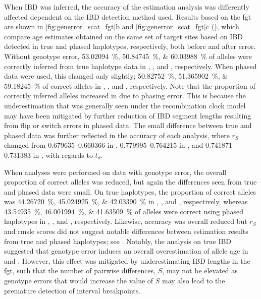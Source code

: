 %

%

When IBD was inferred, the accuracy of the estimation analysis was differently affected dependent on the IBD detection method used.
Results based on the \gls{fgt} are shown in
\cref{fig:generror_scat_fgt}{b} and \ref{fig:generror_scat_fgt}{c} (), which compare age estimates obtained on the same set of target sites based on IBD detected in true and phased haplotypes, respectively, both before and after error.
Without genotype error, \SIlist{53.02094;50.84745;60.03988}{\percent} of alleles were correctly inferred from true haplotype data in \ClockM, \ClockR, and \ClockC, respectively.
When phased data were used, this changed only slightly; \SIlist{50.82752;51.365902;59.18245}{\percent} of correct alleles in \ClockM, \ClockR, and \ClockC, respectively.
Note that the proportion of correctly inferred alleles increased in \ClockR due to phasing error.
This is because the underestimation that was generally seen under the recombination clock model may have been mitigated by further reduction of IBD segment lengths resulting from flip or switch errors in phased data.
The small difference between true and phased data was further reflected in the accuracy of each analysis, where $r_S$ changed from \numrange{0.679635}{0.660366} in \ClockM, \numrange{0.779995}{0.764215} in \ClockR, and \numrange{0.741871}{0.731383} in \ClockC, with regards to $t_d$.

When analyses were performed on data with genotype error, the overall proportion of correct alleles was reduced, but again the differences seen from true and phased data were small.
On true haplotypes, the proportion of correct alleles was \SIlist{44.26720;45.024925;42.03390}{\percent} in \ClockM, \ClockR, and \ClockC, respectively, whereas \SIlist{43.54935;46.001994;41.63509}{\percent} of alleles were correct using phased haplotypes in \ClockM, \ClockR, and \ClockC, respectively.
Likewise, accuracy was overall reduced but $r_S$ and \gls{rmsle} scores did not suggest notable differences between estimation results from true and phased haplotypes; see .
Notably, the analysis on true IBD suggested that genotype error induces an overall overestimation of allele age in \ClockM and \ClockC.
However, this effect was mitigated by underestimating IBD lengths in the \gls{fgt}, such that the number of pairwise differences, $S$, may not be elevated as genotype errors that would increase the value of $S$ may also lead to the premature detection of interval breakpoints.

